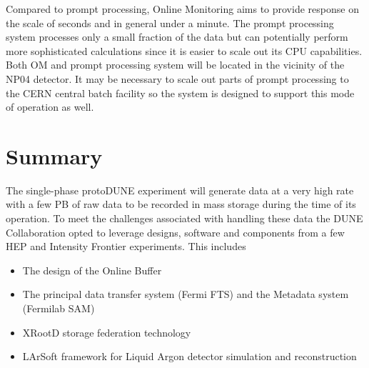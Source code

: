 \documentclass[a4paper]{jpconf}
\newcommand{\pd}{protoDUNE\xspace}
\begin{document}
Compared to prompt processing, Online Monitoring aims
to provide response on the scale of seconds and in general under a minute.
The prompt processing system processes only a small fraction of the data
but can potentially perform more sophisticated calculations since it is
easier to scale out its CPU capabilities. Both OM and prompt processing system
will be located in the vicinity of the NP04 detector. It may be necessary to
scale out parts of prompt processing to the CERN central batch facility
so the system is designed to support this mode of operation as well.

\section{Summary}
The single-phase \pd experiment will generate data at a very high rate
with a few PB of raw data to be recorded in mass storage during the time of
its operation. To meet the challenges associated with handling these
data the DUNE Collaboration opted to leverage designs, software and
components from a few HEP and Intensity Frontier experiments. This includes
\begin{itemize}
\item The design of the Online Buffer
\item The principal data transfer system (Fermi FTS) and the Metadata system (Fermilab SAM)
\item XRootD storage federation technology
\item LArSoft framework for Liquid Argon detector simulation and reconstruction
\end{itemize}
\end{document}
